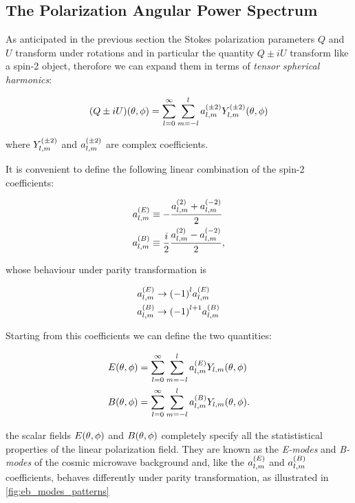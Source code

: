 \subsection{The Polarization Angular Power Spectrum}

As anticipated in the previous section the Stokes polarization parameters
$Q$ and $U$ transform under rotations and in particular the quantity $Q \pm
iU$ transform like a spin-2 object, therofore we can expand them in terms
of \emph{tensor spherical harmonics}:

\begin{equation}
        (Q \pm iU)\qty(\theta,\phi) = \sum^\infty_{l=0}\sum^l_{m=-l}
        a^{\qty(\pm 2)}_{l,m} Y^{\qty(\pm 2)}_{l,m}\qty(\theta,\phi)
\end{equation}

where $Y^{\qty(\pm 2)}_{l,m}$ and $a^{\qty(\pm 2)}_{l,m}$ are complex
coefficients.

It is convenient to define the following linear combination of the spin-2
coefficients:

\begin{align}
        a^{\qty(E)}_{l,m} & \equiv -\frac{a^{\qty(2)}_{l,m} + a^{\qty(-2)}_{l,m}}
        {2} \\
        a^{\qty(B)}_{l,m} & \equiv \frac{i}{2}
        \frac{a^{\qty(2)}_{l,m} - a^{\qty(-2)}_{l,m}}{2},
\end{align}

whose behaviour under parity transformation is

\begin{align}
        a^{\qty(E)}_{l,m} & \rightarrow \qty(-1)^l a^{\qty(E)}_{l,m} \\
        a^{\qty(B)}_{l,m} & \rightarrow \qty(-1)^{l + 1} a^{\qty(B)}_{l,m}
\end{align}

Starting from this coefficients we can define the two quantities:

\begin{align}
        E\qty(\theta,\phi) & = \sum^\infty_{l=0}\sum^l_{m=-l}
        a^{\qty(E)}_{l,m} Y_{l,m}\qty(\theta,\phi) \\
        B\qty(\theta,\phi) & = \sum^\infty_{l=0}\sum^l_{m=-l}
        a^{\qty(B)}_{l,m} Y_{l,m}\qty(\theta,\phi).
\end{align}

the scalar fields $E\qty(\theta,\phi)$ and $B\qty(\theta,\phi)$ completely
specify all the statististical properties of the linear polarization
field. They are known as the \emph{E-modes} and \emph{B-modes} of the
cosmic microwave background and, like the $a^{\qty(E)}_{l,m}$ and
$a^{\qty(B)}_{l,m}$ coefficients, behaves differently under parity
transformation, as illustrated in \autoref{fig:eb_modes_patterns}

